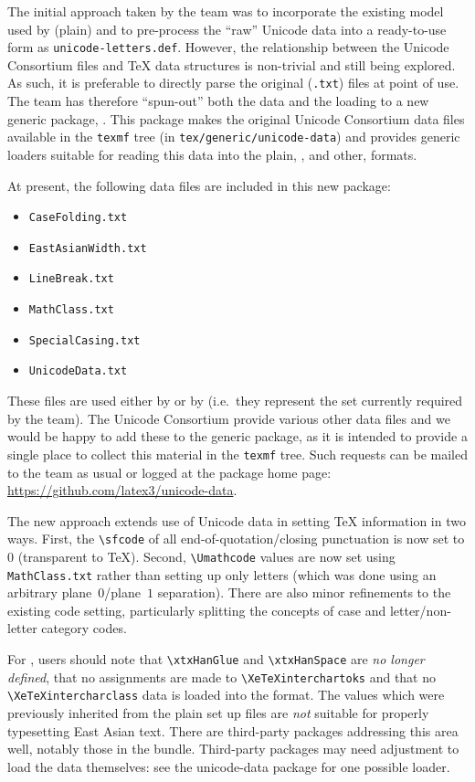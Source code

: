 \documentclass{ltnews}
\begin{document}
The initial approach taken by the team was to incorporate the existing model
used by (plain)  and to pre-process the ``raw'' Unicode data into
a ready-to-use form as \verb|unicode-letters.def|. However, the relationship
between the Unicode Consortium files and \TeX{} data structures is non-trivial and still
being explored. As such, it is preferable to directly parse the original
(\verb|.txt|) files at point of use. The team has therefore ``spun-out'' both
the data and the loading to a new generic package, . This
package makes the original Unicode Consortium data files available in the
\verb|texmf| tree (in \verb|tex/generic/unicode-data|) and provides generic
loaders suitable for reading this data into the plain, \LaTeXe{}, and other,
formats.

At present, the following data files are included in this new package:
\begin{itemize}\parskip=0pt
  \item \verb|CaseFolding.txt|
  \item \verb|EastAsianWidth.txt|
  \item \verb|LineBreak.txt|
  \item \verb|MathClass.txt|
  \item \verb|SpecialCasing.txt|
  \item \verb|UnicodeData.txt|
\end{itemize}
These files are used either by \LaTeXe{} or by 
(i.e.~they represent the set currently required by the team). The
Unicode Consortium provide various other data files and we would be happy to add
these to the generic package, as it is intended to provide a single place
to collect this material in the \verb|texmf| tree. Such requests can be
mailed to the team as usual or logged at the package home page:
\url{https://github.com/latex3/unicode-data}.

The new approach extends use of Unicode data in setting \TeX{} information in
two ways. First, the \verb|\sfcode| of all end-of-quotation/closing punctuation
is now set to $0$ (transparent to \TeX{}). Second, \verb|\Umathcode| values are
now set using \verb|MathClass.txt| rather than setting up only letters (which
was done using an arbitrary plane~$0$/plane~$1$ separation). There are also
minor refinements to the existing code setting, particularly splitting the
concepts of case and letter/non-letter category codes.

For , users should note that \verb|\xtxHanGlue| and
\verb|\xtxHanSpace| are \emph{no longer defined}, that no assignments are made
to \verb|\XeTeXinterchartoks| and that no \verb|\XeTeXintercharclass| data is
loaded into the format. The values which were previously inherited from
the plain  set up files are \emph{not} suitable for properly
typesetting East Asian text. There are third-party packages addressing this
area well, notably those in the  bundle. Third-party packages
may need adjustment to load the data themselves: see the \textsf{unicode-data}
package for one possible loader.
\end{document}
